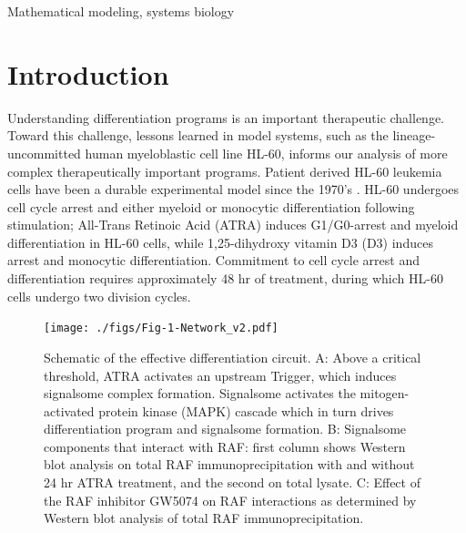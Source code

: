 \documentclass[10pt,twocolumn,twoside,final]{IEEEtran}
\begin{document}
\begin{IEEEkeywords}
Mathematical modeling, systems biology
\end{IEEEkeywords}


\section{Introduction}
Understanding differentiation programs is an important
therapeutic challenge. Toward this challenge, lessons learned
in model systems, such as the lineage-uncommitted human
myeloblastic cell line HL-60, informs our analysis of more
complex therapeutically important programs. Patient derived HL-60 leukemia  cells have been
a durable experimental model since the 1970’s \cite{Breitman1980}.
HL-60 undergoes cell cycle arrest and either myeloid or monocytic differentiation following stimulation;
All-Trans Retinoic Acid (ATRA) induces G1/G0-arrest and myeloid differentiation in HL-60 cells,
while 1,25-dihydroxy vitamin D3 (D3) induces arrest and monocytic differentiation.
Commitment to cell cycle arrest and differentiation requires approximately 48 hr of treatment,
during which HL-60 cells undergo two division cycles.

\begin{figure}[!t]
\texttt{[image: ./figs/Fig-1-Network\_v2.pdf]}
\caption{Schematic of the effective differentiation circuit.
A: Above a critical threshold, ATRA activates an upstream Trigger, which induces signalsome complex formation.
Signalsome activates the mitogen-activated protein kinase (MAPK) cascade which in turn
drives differentiation program and signalsome formation.
B: Signalsome components that interact with RAF:
first column shows Western blot analysis on total RAF immunoprecipitation with and without 24 hr ATRA treatment,
and the second on total lysate.
C: Effect of the RAF inhibitor GW5074 on RAF interactions as determined by Western blot analysis of total RAF immunoprecipitation.}\label{fig:network}
\end{figure}
\end{document}
